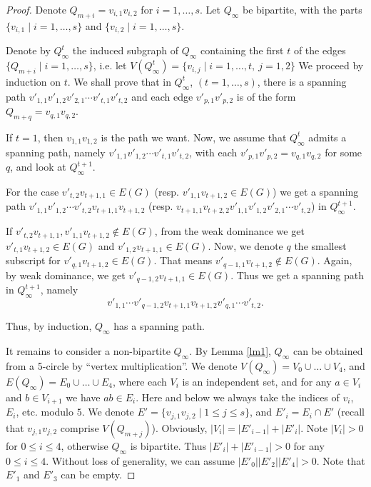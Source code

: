 \documentclass{amsart}
\theoremstyle{definition}
\begin{document}
\begin{proof}
Denote $Q_{m+i}=v_{i,1}v_{i,2}$ for $i=1,\ldots,s$.
Let $Q_{\infty}$ be bipartite, with the parts $\{v_{i,1}\mid i=1,\ldots,s\}$ and $\{v_{i,2}\mid i=1,\ldots,s\}$. 


Denote by $Q^t_{\infty}$ the induced subgraph of $Q_{\infty}$ containing the first $t$ of the edges $\{Q_{m+i}\mid i=1,\ldots,s\}$, i.e. let $V(Q^t_{\infty})=\{v_{i,j}\mid i=1,\ldots,t, \ j=1,2\}$
We proceed by induction on $t$. We shall prove that in $Q^t_{\infty}$, $(t=1,\ldots,s)$, there is a spanning path $v'_{1,1}v'_{1,2}v'_{2,1}\cdots v'_{t,1}v'_{t,2}$ and each edge $v'_{p,1}v'_{p,2}$ is 
of the form $Q_{m+q}=v_{q,1}v_{q,2}$.


If $t=1$, then $v_{1,1}v_{1,2}$ is the path we want. Now, we assume that $Q^t_{\infty}$ admits a spanning path, namely $v'_{1,1}v'_{1,2}\cdots v'_{t,1}v'_{t,2}$, with each $v'_{p,1}v'_{p,2}=v_{q,1}v_{q,2}$ for some $q$, and look at $Q^{t+1}_{\infty}$.

For the case $v'_{t,2}v_{t+1,1}\in E(G)$ 
(resp. $v'_{1,1}v_{t+1,2}\in E(G)$)
we get a spanning path 
$v'_{1,1} v'_{1,2}\cdots v'_{t,2} v_{t+1,1} v_{t+1,2}$
(resp. $v_{t+1,1} v_{t+2,2} v'_{1,1} v'_{1,2} v'_{2,1}\cdots v'_{t,2}$)
in $Q^{t+1}_{\infty}$.

If $v'_{t,2}v_{t+1,1},v'_{1,1}v_{t+1,2}\not\in E(G)$, from the weak dominance
we get $v'_{t,1}v_{t+1,2}\in E(G)$ and $v'_{1,2}v_{t+1,1}\in E(G)$. Now, we
denote $q$ the smallest subscript for $v'_{q,1}v_{t+1,2}\in E(G)$. That
means $v'_{q-1,1}v_{t+1,2}\not\in E(G)$. Again, by weak dominance,
we get $v'_{q-1,2}v_{t+1,1}\in E(G)$. Thus we get a spanning path in
$Q^{t+1}_{\infty}$, namely $$v'_{1,1}\cdots
v'_{q-1,2}v_{t+1,1}v_{t+1,2}v'_{q,1}\cdots v'_{t,2}.$$

Thus, by induction, $Q_{\infty}$ has a spanning path.%

\medskip

It remains to consider a non-bipartite $Q_{\infty}$. By Lemma \ref{lm1},
$Q_{\infty}$ can be obtained from a 5-circle by ``vertex multiplication''. We
denote $V(Q_{\infty})=V_0\cup \dots \cup V_4$, and
$E(Q_{\infty})=E_0\cup \dots \cup E_4$, where each $V_i$ is an
independent set, and  for any $a\in V_i$ and $b\in V_{i+1}$ we have $ab\in E_i$. 
Here and below we always take the indices of $v_i$, $E_i$, etc. modulo $5$.
We denote
$E'=\{v_{j,1}v_{j,2}\mid 1\leq j\leq s\}$, and $E'_i=E_i\cap E'$ (recall that $v_{j,1}v_{j,2}$
comprise $V(Q_{m+j})$). Obviously,
$|V_i|=|E'_{i-1}|+|E'_i|$. Note $|V_i|>0$ for $0\leq i\leq 4$, otherwise
$Q_{\infty}$ is bipartite. Thus $|E'_i|+|E'_{i-1}|>0$ for any $0\leq i\leq 4$. 
Without loss of generality, we can assume $|E'_0||E'_2||E'_4|>0$.
Note that $E'_1$ and $E'_3$ can be empty.


\end{proof}
\end{document}
